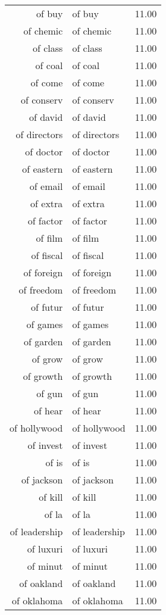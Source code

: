 \begin{table}[ht]
\begin{tabular}{rlr}
  of buy & of buy & 11.00 \\ 
  of chemic & of chemic & 11.00 \\ 
  of class & of class & 11.00 \\ 
  of coal & of coal & 11.00 \\ 
  of come & of come & 11.00 \\ 
  of conserv & of conserv & 11.00 \\ 
  of david & of david & 11.00 \\ 
  of directors & of directors & 11.00 \\ 
  of doctor & of doctor & 11.00 \\ 
  of eastern & of eastern & 11.00 \\ 
  of email & of email & 11.00 \\ 
  of extra & of extra & 11.00 \\ 
  of factor & of factor & 11.00 \\ 
  of film & of film & 11.00 \\ 
  of fiscal & of fiscal & 11.00 \\ 
  of foreign & of foreign & 11.00 \\ 
  of freedom & of freedom & 11.00 \\ 
  of futur & of futur & 11.00 \\ 
  of games & of games & 11.00 \\ 
  of garden & of garden & 11.00 \\ 
  of grow & of grow & 11.00 \\ 
  of growth & of growth & 11.00 \\ 
  of gun & of gun & 11.00 \\ 
  of hear & of hear & 11.00 \\ 
  of hollywood & of hollywood & 11.00 \\ 
  of invest & of invest & 11.00 \\ 
  of is & of is & 11.00 \\ 
  of jackson & of jackson & 11.00 \\ 
  of kill & of kill & 11.00 \\ 
  of la & of la & 11.00 \\ 
  of leadership & of leadership & 11.00 \\ 
  of luxuri & of luxuri & 11.00 \\ 
  of minut & of minut & 11.00 \\ 
  of oakland & of oakland & 11.00 \\ 
  of oklahoma & of oklahoma & 11.00 \\ 

\end{tabular}
\end{table}
